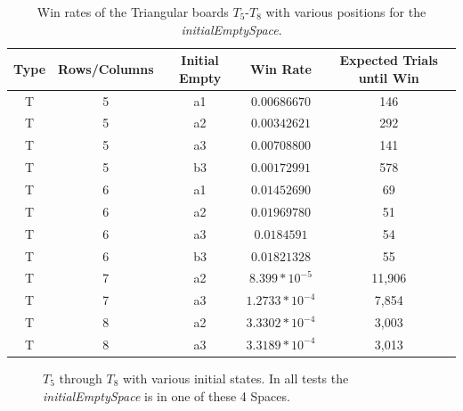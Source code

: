 \documentclass{article}
\begin{document}
\begin{table}[htb]
\begin{center} 
\begin{tabularx}{.88\textwidth}{ c  c  c  c  c }
\hline
\textbf{Type} & \textbf{Rows/Columns} &\textbf{Initial Empty} & \textbf{Win Rate} & \textbf{Expected Trials until Win}\\
\hline
T & 5 & a1 & $0.00686670$ & 146\\

T & 5 & a2 & $0.00342621$ & 292\\

T & 5 & a3 & $0.00708800$ & 141\\

T & 5 & b3 & $0.00172991$ & 578\\

T & 6 & a1 & $0.01452690$ & 69\\

T & 6 & a2 & $0.01969780$ & 51\\

T & 6 & a3 & $0.0184591$ & 54\\

T & 6 & b3 & $0.01821328$ & 55\\

T & 7 & a2 & $8.399*10^{-5}$& 11,906\\

T & 7 & a3 & $1.2733*10^{-4}$ & 7,854\\

T & 8 & a2 & $3.3302*10^{-4}$& 3,003\\

T & 8 & a3 & $3.3189*10^{-4}$ & 3,013\\

\end{tabularx}
\caption{Win rates of the Triangular boards $T_5$-$T_8$ with various positions for the \textit{initialEmptySpace}.}
\label{tab3}
\end{center} 
\end{table}

\begin{figure}[htb]
\centering
{}
\caption{$T_5$ through $T_8$ with various initial states. In all tests the \textit{initialEmptySpace} is in one of these 4 Spaces.}
\label{fig8}
\end{figure}
\end{document}
